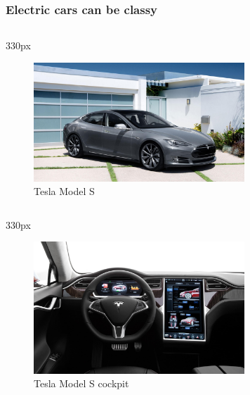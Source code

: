 {
\logo{}
\begin{frame}
\frametitle{Electric cars can be classy}
\begin{center}
\begin{columns}
\begin{column}{330px}
{
    \begin{figure}[h!]
        \centering
        \includegraphics[width=300px]
            {images/tesla-model-s.jpg}
        \vspace{-0.5em}
        \caption{Tesla Model S}
    \end{figure}
}
\end{column}
\end{columns}
\end{center}
\end{frame}
}


{
\logo{}
\begin{frame}
\begin{center}
\begin{columns}
\begin{column}{330px}
{
    \begin{figure}[h!]
        \centering
        \includegraphics[width=300px]
            {images/tesla-model-s-cockpit.jpg}
        \vspace{-0.5em}
        \caption{Tesla Model S cockpit}
    \end{figure}
}
\end{column}
\end{columns}
\end{center}
\end{frame}
}


